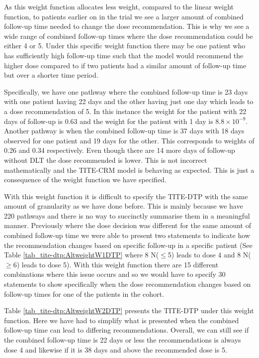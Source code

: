 As this weight function allocates less weight, compared to the linear weight function, to patients earlier on in the trial we see a larger amount of combined follow-up time needed to change the dose recommendation. This is why we see a wide range of combined follow-up times where the dose recommendation could be either 4 or 5. Under this specific weight function there may be one patient who has sufficiently high follow-up time such that the model would recommend the higher dose compared to if two patients had a similar amount of follow-up time but over a shorter time period. 

Specifically, we have one pathway where the combined follow-up time is 23 days with one patient having 22 days and the other having just one day which leads to a dose recommendation of 5. In this instance the weight for the patient with 22 days of follow-up is 0.63 and the weight for the patient with 1 day is $8.8 \times 10^{-9}$. Another pathway is when the combined follow-up time is 37 days with 18 days observed for one patient and 19 days for the other. This corresponds to weights of 0.26 and 0.34 respectively. Even though there are 14 more days of follow-up without DLT the dose recommended is lower. This is not incorrect mathematically and the TITE-CRM model is behaving as expected. This is just a consequence of the weight function we have specified. 

With this weight function it is difficult to specify the TITE-DTP with the same amount of granularity as we have done before. This is mainly because we have 220 pathways and there is no way to succinctly summarise them in a meaningful manner. Previously where the dose decision was different for the same amount of combined follow-up time we were able to present two statements to indicate how the recommendation changes based on specific follow-up in a specific patient (See Table \ref{tab_tite-dtp:AltweightW1DTP} where 8 N($\leq$5) leads to dose 4 and 8 N($\geq$6) leads to dose 5). With this weight function there are 15 different combinations where this issue occurs and so we would have to specify 30 statements to show specifically when the dose recommendation changes based on follow-up times for one of the patients in the cohort. 

Table \ref{tab_tite-dtp:AltweightW2DTP} presents the TITE-DTP under this weight function. Here we have had to simplify what is presented when the combined follow-up time can lead to differing recommendations. Overall, we can still see if the combined follow-up time is 22 days or less the recommendations is always dose 4 and likewise if it is 38 days and above the recommended dose is 5.  

